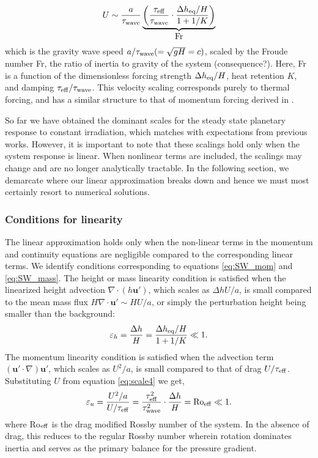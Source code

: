 \documentclass[trackchanges,twocolumn]{aastex7}
\begin{document}
\begin{equation}
    U \sim \frac{a}{\tau_{\rm wave}}
    \underbrace{\left(\frac{\tau_{\rm eff}}{\tau_{\rm wave}} \cdot
                      \frac{\Delta h_{\rm eq}/H}{1+1/K}\right)}_{\textstyle \mathrm{Fr}}
    \label{eq:scale4}
\end{equation}
which is the gravity wave speed $a/\tau_{\rm wave}(=\sqrt{gH}=c)$, scaled by the Froude number Fr, the ratio of inertia to gravity of the system {\color{red}(consequence?)}. Here, Fr is a function of the dimensionless forcing strength $\Delta h_{\rm eq}/H$, heat retention $K$, and damping $\tau_{\rm eff}/\tau_{\rm wave}$. This velocity scaling corresponds purely to thermal forcing, and has a similar structure to that of momentum forcing derived in \cite{komacek2025limited}. 

So far we have obtained the dominant scales for the steady state planetary response to constant irradiation, which matches with expectations from previous works. However, it is important to note that these scalings hold only when the system response is linear. When nonlinear terms are included, the scalings may change and are no longer analytically tractable. In the following section, we demarcate where our linear approximation breaks down and hence we must most certainly resort to numerical solutions.

\subsubsection{Conditions for linearity}

The linear approximation holds only when the non-linear terms in the momentum and continuity equations are negligible compared to the corresponding linear terms. We identify conditions corresponding to equations \eqref{eq:SW_mom} and \eqref{eq:SW_mass}.
The height or mass linearity condition is satisfied when the linearized height advection $\nabla \cdot (h\mathbf{u}')$, which scales as $\Delta hU/a$, is small compared to the mean mass flux $H \nabla \cdot \mathbf{u}' \sim HU/a$, or simply the perturbation height being smaller than the background:
    \begin{equation}
     \varepsilon_h = \frac{\Delta h}{H} = \frac{\Delta  h_{\rm eq}/H}{1+1/K} \ll 1. \label{eq:lin_condt2}
    \end{equation}
The momentum linearity condition is satisfied when the advection term $(\mathbf{u}' \cdot \nabla)\mathbf{u}'$, which scales as $U^2/a$, is small compared to that of drag $U/\tau_{\rm eff}$. Substituting $U$ from equation \eqref{eq:scale4} we get,
    \begin{equation}
    \varepsilon_u = \frac{U^2/a}{U/\tau_{\rm eff}} = \frac{\tau_{\rm eff}^2}{\tau_{\rm wave}^2} \cdot \frac{\Delta h}{H} = \mathrm{Ro}_{\rm eff} \ll 1.         \label{eq:lin_condt1}
 \end{equation}
where Ro$_{\rm eff}$ is the drag modified Rossby number of the system. In the absence of drag, this reduces to the regular Rossby number wherein rotation dominates inertia and serves as the primary balance for the pressure gradient. 
    
\end{document}
